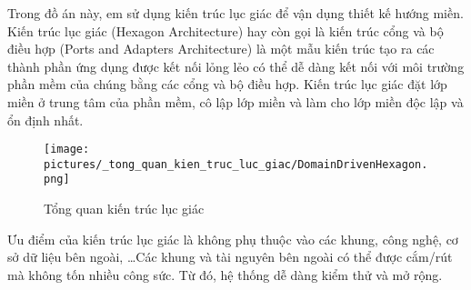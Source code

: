 Trong đồ án này, em sử dụng kiến trúc lục giác để vận dụng thiết kế hướng miền. Kiến trúc lục giác (Hexagon Architecture) hay còn gọi là kiến trúc cổng và bộ điều hợp (Ports and Adapters Architecture) là một mẫu kiến trúc tạo ra các thành phần ứng dụng được kết nối lỏng lẻo có thể dễ dàng kết nối với môi trường phần mềm của chúng bằng các cổng và bộ điều hợp. Kiến trúc lục giác đặt lớp miền ở trung tâm của phần mềm, cô lập lớp miền và làm cho lớp miền độc lập và ổn định nhất.

\begin{figure}[H]

\centering

\texttt{[image: pictures/\_tong\_quan\_kien\_truc\_luc\_giac/DomainDrivenHexagon.png]}

\caption{Tổng quan kiến trúc lục giác}

\end{figure}

Ưu điểm của kiến trúc lục giác là không phụ thuộc vào các khung, công nghệ, cơ sở dữ liệu bên ngoài, \dots Các khung và tài nguyên bên ngoài có thể được cắm/rút mà không tốn nhiều công sức. Từ đó, hệ thống dễ dàng kiểm thử và mở rộng.






















